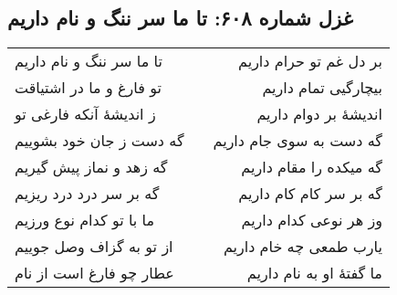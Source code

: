 \begin{center}
\section*{غزل شماره ۶۰۸: تا ما سر ننگ و نام داریم}
\label{sec:608}
\begin{longtable}{l p{0.5cm} r}
تا ما سر ننگ و نام داریم
&&
بر دل غم تو حرام داریم
\\
تو فارغ و ما در اشتیاقت
&&
بیچارگیی تمام داریم
\\
ز اندیشهٔ آنکه فارغی تو
&&
اندیشهٔ بر دوام داریم
\\
گه دست ز جان خود بشوییم
&&
گه دست به سوی جام داریم
\\
گه زهد و نماز پیش گیریم
&&
گه میکده را مقام داریم
\\
گه بر سر درد درد ریزیم
&&
گه بر سر کام کام داریم
\\
ما با تو کدام نوع ورزیم
&&
وز هر نوعی کدام داریم
\\
از تو به گزاف وصل جوییم
&&
یارب طمعی چه خام داریم
\\
عطار چو فارغ است از نام
&&
ما گفتهٔ او به نام داریم
\\
\end{longtable}
\end{center}
